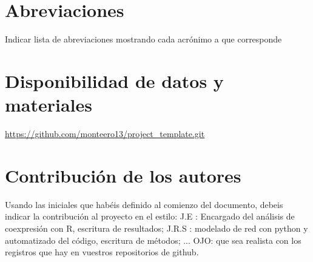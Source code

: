 \documentclass{bmcart}
\begin{document}
	\begin{backmatter}
	
		\section*{Abreviaciones}%
			Indicar lista de abreviaciones mostrando cada acrónimo a que corresponde
		
		\section*{Disponibilidad de datos y materiales}%
			\url{https://github.com/monteero13/project_template.git}
		
		\section*{Contribución de los autores}
			Usando las iniciales que habéis definido al comienzo del documento, debeis indicar la contribución al proyecto en el estilo:
			J.E : Encargado del análisis de coexpresión con R, escritura de resultados; J.R.S : modelado de red con python y automatizado del código, escritura de métodos; ...
			OJO: que sea realista con los registros que hay en vuestros repositorios de github. 
		
		
		
	
	\end{backmatter}
\end{document}
